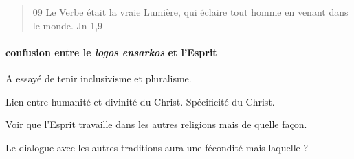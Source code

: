\begin{quote}
    09 Le Verbe était la vraie Lumière, qui éclaire tout homme en venant dans le monde. Jn 1,9
\end{quote}




\paragraph{confusion entre le \textit{logos ensarkos} et l'Esprit} 


\begin{Synthesis}

    A essayé de tenir inclusivisme et pluralisme.
    
    Lien entre humanité et divinité du Christ. Spécificité du Christ. 
    
    Voir que l'Esprit travaille dans les autres religions mais de quelle façon. 

    Le dialogue avec les autres traditions aura une fécondité mais laquelle ?
\end{Synthesis}

